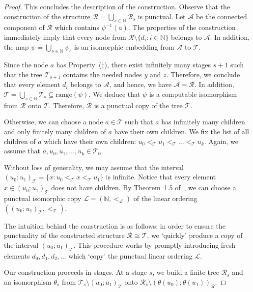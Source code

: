 \documentclass[a4paper,UKenglish,cleveref, autoref, thm-restate]{lipics-v2021}
\begin{document}
\begin{proof}
This concludes the description of the construction. Observe that the construction of the structure $\mathcal{R}= \bigcup_{s\in\mathbb{N}} \mathcal{R}_s$ is punctual. Let $\mathcal{A}$ be the connected component of $\mathcal{R}$ which contains $\psi^{-1}(a)$. The properties of the construction immediately imply that every node from $\mathcal{R} \setminus \{ d_i : i\in\mathbb{N}\}$ belongs to $\mathcal{A}$. In addition, the map $\psi = \bigcup_{s\in\mathbb{N}} \psi_s$ is an isomorphic embedding from $\mathcal{A}$ to $\mathcal{T}$.

Since the node $a$ has Property~($\ddagger$), there exist infinitely many stages $s+1$ such that the tree $\mathcal{T}_{s+1}$ contains the needed nodes $y$ and $z$. Therefore, we conclude that every element $d_i$ belongs to $\mathcal{A}$, and hence, we have $\mathcal{A} = \mathcal{R}$. In addition, $\mathcal{T} =\bigcup_{s\in\mathbb{N}} \mathcal{T}_s \subseteq \mathrm{range}(\psi)$. We deduce that $\psi$ is a computable isomorphism from $\mathcal{R}$ onto $\mathcal{T}$. Therefore, $\mathcal{R}$ is a punctual copy of the tree $\mathcal{T}$.

 Otherwise, we can choose a node $a\in \mathcal{T}$ such that $a$ has infinitely many children and only finitely many children of $a$ have their own children. We fix the list of all children of $a$ which have their own children: $u_0 <_{\mathcal{T}} u_1 <_{\mathcal{T}} \dots <_{\mathcal{T}} u_k$. Again, we assume that $a,u_0,u_1,\ldots,u_k\in\mathcal{T}_0$.

Without loss of generality, we may assume that the interval $(u_0; u_1)_{\mathcal{T}} = \{ x : u_0 <_{\mathcal{T}} x <_{\mathcal{T}} u_1\}$ is infinite. Notice that every element $x\in (u_0; u_1)_{\mathcal{T}}$ does not have children. By Theorem~1.5 of~\cite{kalimullin_algebraic_2017}, we can choose a punctual isomorphic copy $\mathcal{L} = (\mathbb{N}, <_{\mathcal{L}})$ of the linear ordering $( (u_0; u_1)_{\mathcal{T}}, <_{\mathcal{T}})$. 

The intuition behind the construction is as follows: in order to ensure the punctuality of the constructed structure $\mathcal{R}\cong \mathcal{T}$, we `quickly' produce a copy of the interval $(u_0;u_1)_{\mathcal{T}}$. This procedure works by promptly introducing fresh elements $d_0,d_1,d_2,\ldots$ which `copy' the punctual linear ordering $\mathcal{L}$.

Our construction proceeds in stages. At a stage $s$, we build a finite tree $\mathcal{R}_s$ and an isomorphism $\theta_s$ from $\mathcal{T}_s \setminus (u_0; u_1)_{\mathcal{T}}$ onto $\mathcal{R}_s\setminus (\theta(u_0); \theta(u_1))_{\mathcal{R}}$.


\end{proof}
\end{document}
